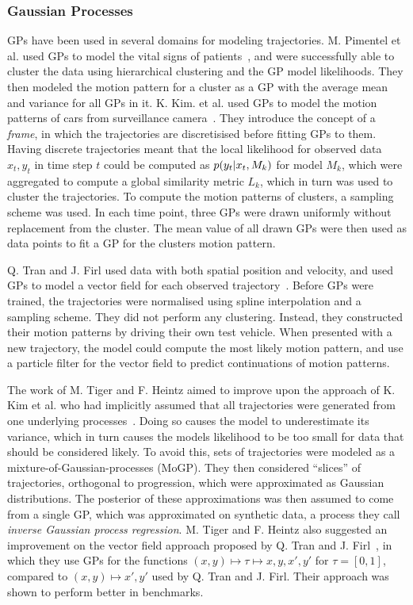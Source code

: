 \subsubsection{Gaussian Processes}
GPs have been used in several domains for modeling trajectories.
M. Pimentel et al. used GPs to model the vital signs of patients~\cite{Pimentel2013Sep}, 
and were successfully able to cluster the data using hierarchical clustering
and the GP model likelihoods. They then modeled the motion pattern
for a cluster as a GP with the average mean and variance for all GPs in it.
K. Kim. et al. used GPs to model the motion patterns of cars from
surveillance camera~\cite{Kim2011Nov}. They introduce the
concept of a \textit{frame}, in which the trajectories are
discretisised before fitting GPs to them. Having discrete trajectories meant that
the local likelihood for observed data $x_t, y_t$ in time step $t$
could be computed as $p(y_t | x_t, {M_k})$ for model $M_k$, which
were aggregated to compute a global similarity metric $L_k$,
which in turn was used to cluster the trajectories. To compute the motion
patterns of clusters, a sampling scheme was used. In each time
point, three GPs were drawn uniformly without replacement from the
cluster. The mean value of all drawn GPs were then used as data points
to fit a GP for the clusters motion pattern.

Q. Tran and J. Firl used data with both spatial position and velocity,
and used GPs to model a vector field for each observed
trajectory~\cite{Tran2014Jun}. Before GPs were trained, the trajectories 
were normalised using spline interpolation and a
sampling scheme. They did not perform any clustering. Instead, they
constructed their motion patterns by driving their own test vehicle. 
When presented with a new trajectory, the model could compute the most
likely motion pattern, and use a particle filter for the vector
field to predict continuations of motion patterns. 

The work of M. Tiger and F. Heintz aimed to improve upon the approach of K. Kim et
al. who had implicitly assumed that all trajectories were generated
from one underlying processes~\cite{Tiger2015Jul}. Doing so causes the model to
underestimate its variance, which in turn causes the models likelihood
to be too small for data that should be considered likely. To avoid this,
sets of trajectories were modeled as a
mixture-of-Gaussian-processes (MoGP). They then considered ``slices''
of trajectories, orthogonal to progression, which were approximated as
Gaussian distributions. The posterior of these approximations was
then assumed to come from a single GP, which was approximated on synthetic data, 
a process they call \textit{inverse Gaussian process regression}.
M. Tiger and F. Heintz also suggested an improvement on
the vector field approach proposed by Q. Tran and
J. Firl~\cite{Tiger2018Jun}, in which they use GPs for the functions
$(x, y) \mapsto \tau \mapsto x, y, x', y'$ for $\tau = [0, 1]$, compared to
$(x, y) \mapsto x', y'$ used by Q. Tran and J. Firl. Their approach
was shown to perform better in benchmarks.

